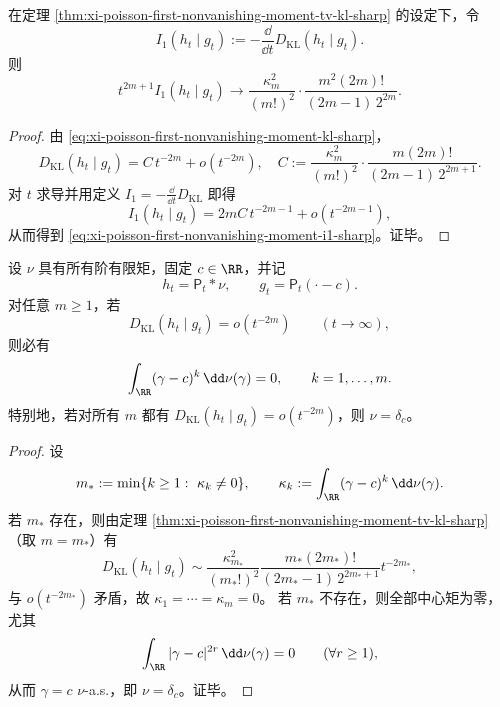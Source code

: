 \begin{corollary}\label{cor:xi-poisson-first-nonvanishing-moment-i1-sharp}
在定理 \ref{thm:xi-poisson-first-nonvanishing-moment-tv-kl-sharp} 的设定下，令
\[
I_1(h_t\mid g_t):=-\frac{\dd}{\dd t}D_{\mathrm{KL}}(h_t\mid g_t).
\]
则
\begin{equation}\label{eq:xi-poisson-first-nonvanishing-moment-i1-sharp}
t^{2m+1}I_1(h_t\mid g_t)
\longrightarrow
\frac{\kappa_m^2}{(m!)^2}\cdot
\frac{m^2(2m)!}{(2m-1)\,2^{2m}}.
\end{equation}
\end{corollary}
\begin{proof}
由 \eqref{eq:xi-poisson-first-nonvanishing-moment-kl-sharp}，
\[
D_{\mathrm{KL}}(h_t\mid g_t)=C\,t^{-2m}+o(t^{-2m}),
\quad
C:=\frac{\kappa_m^2}{(m!)^2}\cdot\frac{m(2m)!}{(2m-1)\,2^{2m+1}}.
\]
对 \(t\) 求导并用定义
\(
I_1=-\frac{\dd}{\dd t}D_{\mathrm{KL}}
\)
即得
\[
I_1(h_t\mid g_t)=2mC\,t^{-2m-1}+o(t^{-2m-1}),
\]
从而得到 \eqref{eq:xi-poisson-first-nonvanishing-moment-i1-sharp}。证毕。
\end{proof}

\begin{proposition}[KL 衰减阶对矩消失的必要条件]\label{prop:xi-poisson-kl-rate-implies-moment-cancellation}
设 \(\nu\) 具有所有阶有限矩，固定 \(c\in\RR\)，并记
\[
h_t=\mathsf P_t*\nu,\qquad
g_t=\mathsf P_t(\cdot-c).
\]
对任意 \(m\ge 1\)，若
\[
D_{\mathrm{KL}}(h_t\mid g_t)=o(t^{-2m})\qquad(t\to\infty),
\]
则必有
\[
\int_{\RR}(\gamma-c)^k\,\dd\nu(\gamma)=0,\qquad k=1,\dots,m.
\]
特别地，若对所有 \(m\) 都有
\(
D_{\mathrm{KL}}(h_t\mid g_t)=o(t^{-2m})
\)，则 \(\nu=\delta_c\)。
\end{proposition}
\begin{proof}
设
\[
m_\ast:=\min\{k\ge 1:\ \kappa_k\neq 0\},
\qquad
\kappa_k:=\int_{\RR}(\gamma-c)^k\,\dd\nu(\gamma).
\]
若 \(m_\ast\) 存在，则由定理
\ref{thm:xi-poisson-first-nonvanishing-moment-tv-kl-sharp}
（取 \(m=m_\ast\)）有
\[
D_{\mathrm{KL}}(h_t\mid g_t)\sim
\frac{\kappa_{m_\ast}^2}{(m_\ast!)^2}
\frac{m_\ast(2m_\ast)!}{(2m_\ast-1)\,2^{2m_\ast+1}}
t^{-2m_\ast},
\]
与 \(o(t^{-2m_\ast})\) 矛盾，故 \(\kappa_1=\cdots=\kappa_m=0\)。
若 \(m_\ast\) 不存在，则全部中心矩为零，尤其
\[
\int_{\RR}|\gamma-c|^{2r}\,\dd\nu(\gamma)=0\qquad(\forall r\ge 1),
\]
从而 \(\gamma=c\) \(\nu\)-a.s.，即 \(\nu=\delta_c\)。证毕。
\end{proof}

